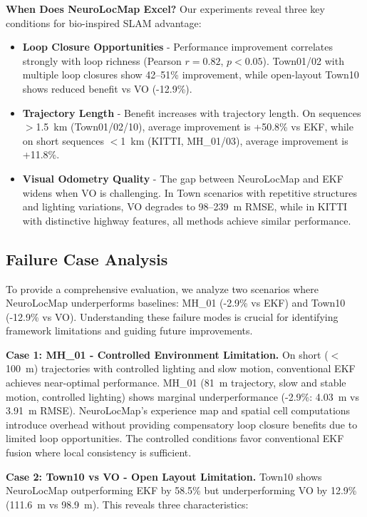\textbf{When Does NeuroLocMap Excel?} Our experiments reveal three key conditions for bio-inspired SLAM advantage:

\begin{itemize}
    \item \textbf{Loop Closure Opportunities} - Performance improvement correlates strongly with loop richness (Pearson $r=0.82$, $p<0.05$). Town01/02 with multiple loop closures show 42--51\% improvement, while open-layout Town10 shows reduced benefit vs VO (-12.9\%).
    
    \item \textbf{Trajectory Length} - Benefit increases with trajectory length. On sequences $>$1.5~km (Town01/02/10), average improvement is +50.8\% vs EKF, while on short sequences $<$1~km (KITTI, MH\_01/03), average improvement is +11.8\%.
    
    \item \textbf{Visual Odometry Quality} - The gap between NeuroLocMap and EKF widens when VO is challenging. In Town scenarios with repetitive structures and lighting variations, VO de\-grades to 98--239~m RMSE, while in KITTI with distinctive highway features, all methods achieve similar per\-for\-mance.
\end{itemize}

\subsection{Failure Case Analysis}
\label{sec:failure_analysis}

To provide a comprehensive evaluation, we analyze two scenarios where NeuroLocMap un\-der\-per\-forms baselines: MH\_01 (-2.9\% vs EKF) and Town10 (-12.9\% vs VO). Understanding these failure modes is crucial for identifying framework limitations and guiding future improvements.

\textbf{Case 1: MH\_01 - Controlled Environment Limitation.} On short ($<$100~m) trajectories with controlled lighting and slow motion, conventional EKF achieves near-optimal per\-for\-mance. MH\_01 (81~m trajectory, slow and stable motion, controlled lighting) shows marginal underperformance (-2.9\%: 4.03~m vs 3.91~m RMSE). NeuroLocMap's experience map and spatial cell computations introduce overhead without providing compensatory loop closure benefits due to limited loop op\-por\-tu\-ni\-ties. The controlled conditions favor conventional EKF fusion where local consistency is sufficient.

\textbf{Case 2: Town10 vs VO - Open Layout Limitation.} Town10 shows NeuroLocMap outperforming EKF by 58.5\% but underperforming VO by 12.9\% (111.6~m vs 98.9~m). This reveals three characteristics:

